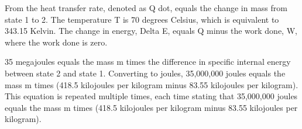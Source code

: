 From the heat transfer rate, denoted as Q dot, equals the change in mass from state 1 to 2. The temperature T is 70 degrees Celsius, which is equivalent to 343.15 Kelvin. The change in energy, Delta E, equals Q minus the work done, W, where the work done is zero. 

35 megajoules equals the mass m times the difference in specific internal energy between state 2 and state 1. Converting to joules, 35,000,000 joules equals the mass m times (418.5 kilojoules per kilogram minus 83.55 kilojoules per kilogram). This equation is repeated multiple times, each time stating that 35,000,000 joules equals the mass m times (418.5 kilojoules per kilogram minus 83.55 kilojoules per kilogram).